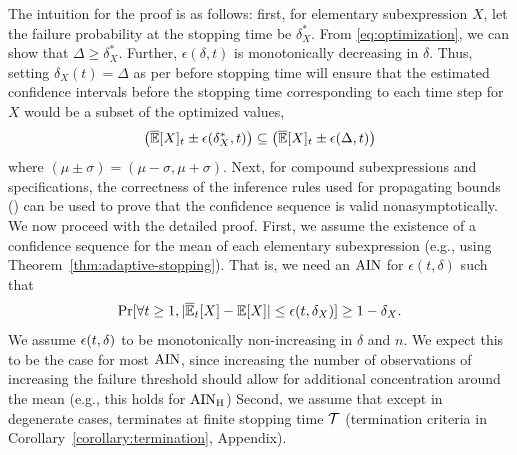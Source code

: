 The intuition for the proof is as follows: first, for elementary subexpression $X$, let the failure probability at the stopping time be $\delta^*_X$.
From \cref{eq:optimization}, we can show that $\Delta \geq \delta^*_X$.
Further, $\epsilon(\delta, t)$ is monotonically decreasing in $\delta$.
Thus, setting $\delta_X(t) = \Delta$ as per  before stopping time will ensure that the estimated confidence intervals before the stopping time corresponding to each time step for $X$ would be a subset of the optimized values, 
\[
 \left(\overline{\mathbb{E}}[X]_t \pm \epsilon(\delta^*_X, t)\right) \subseteq \left(\overline{\mathbb{E}}[X]_t \pm \epsilon(\Delta, t)\right) 
\]
where $\left(\mu \pm \sigma\right) = \left(\mu - \sigma, \mu + \sigma\right)$.
Next, for compound subexpressions and specifications, the correctness of the inference rules used for propagating bounds () can be used to prove that the confidence sequence is valid nonasymptotically.
We now proceed with the detailed proof.
First, we assume the existence of a confidence sequence for the mean of each elementary subexpression (e.g., using Theorem~\ref{thm:adaptive-stopping}). 
That is, we need an $\rm{AIN}$ for $\epsilon(t, \delta)$ such that
\begin{equation}
    \Pr[\forall t \geq 1, |\overline{\mathbb{E}}_t[X] - \mathbb{E}[X]| \leq \epsilon(t, \delta_X)] \geq 1 - \delta_X.
    \label{eqn:conf-seq:elementary:assumed}
\end{equation}
We assume ${\epsilon}(t, \delta)$ to be monotonically non-increasing in $\delta$ and $n$. 
We expect this to be the case for most $\rm{AIN}$, since increasing the number of observations of increasing the failure threshold should allow for additional concentration around the mean (e.g., this holds for $\rm{AIN}_H$)
Second, we assume that except in degenerate cases, \AVOIRmethodname{} terminates at finite stopping time ${\mathcal{T}}$ (termination criteria in Corollary~\ref{corollary:termination}, Appendix). 
